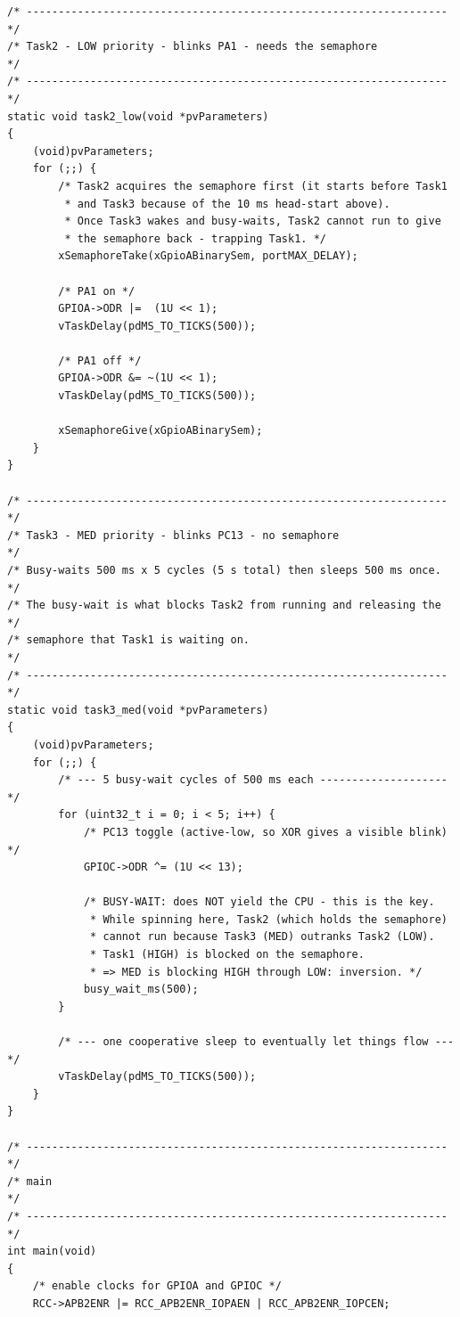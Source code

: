 ﻿\documentclass[12pt,a4paper]{article}
\begin{document}
\begin{lstlisting}
/* ------------------------------------------------------------------ */
/* Task2 - LOW priority - blinks PA1 - needs the semaphore             */
/* ------------------------------------------------------------------ */
static void task2_low(void *pvParameters)
{
    (void)pvParameters;
    for (;;) {
        /* Task2 acquires the semaphore first (it starts before Task1
         * and Task3 because of the 10 ms head-start above).
         * Once Task3 wakes and busy-waits, Task2 cannot run to give
         * the semaphore back - trapping Task1. */
        xSemaphoreTake(xGpioABinarySem, portMAX_DELAY);

        /* PA1 on */
        GPIOA->ODR |=  (1U << 1);
        vTaskDelay(pdMS_TO_TICKS(500));

        /* PA1 off */
        GPIOA->ODR &= ~(1U << 1);
        vTaskDelay(pdMS_TO_TICKS(500));

        xSemaphoreGive(xGpioABinarySem);
    }
}

/* ------------------------------------------------------------------ */
/* Task3 - MED priority - blinks PC13 - no semaphore                   */
/* Busy-waits 500 ms x 5 cycles (5 s total) then sleeps 500 ms once.  */
/* The busy-wait is what blocks Task2 from running and releasing the   */
/* semaphore that Task1 is waiting on.                                 */
/* ------------------------------------------------------------------ */
static void task3_med(void *pvParameters)
{
    (void)pvParameters;
    for (;;) {
        /* --- 5 busy-wait cycles of 500 ms each -------------------- */
        for (uint32_t i = 0; i < 5; i++) {
            /* PC13 toggle (active-low, so XOR gives a visible blink) */
            GPIOC->ODR ^= (1U << 13);

            /* BUSY-WAIT: does NOT yield the CPU - this is the key.
             * While spinning here, Task2 (which holds the semaphore)
             * cannot run because Task3 (MED) outranks Task2 (LOW).
             * Task1 (HIGH) is blocked on the semaphore.
             * => MED is blocking HIGH through LOW: inversion. */
            busy_wait_ms(500);
        }

        /* --- one cooperative sleep to eventually let things flow --- */
        vTaskDelay(pdMS_TO_TICKS(500));
    }
}

/* ------------------------------------------------------------------ */
/* main                                                                 */
/* ------------------------------------------------------------------ */
int main(void)
{
    /* enable clocks for GPIOA and GPIOC */
    RCC->APB2ENR |= RCC_APB2ENR_IOPAEN | RCC_APB2ENR_IOPCEN;


\end{lstlisting}
\end{document}
